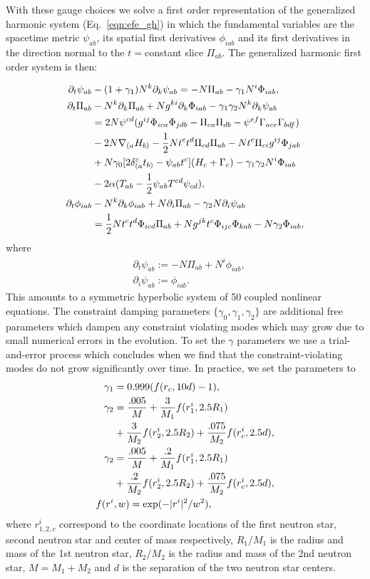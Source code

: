With these gauge choices we solve a first order representation of the generalized harmonic system (Eq.~\ref{eqn:efe_gh}) in which the fundamental variables are the spacetime metric $\psi_{ab}$, its spatial first derivatives $\phi_{iab}$ and its first derivatives in the direction normal to the $t=$constant slice $\Pi_{ab}$. The generalized harmonic first order system is then:

\begin{align}
  \partial_t\psi_{ab} &- (1 + \gamma_1)N^k\partial_k\psi_{ab} = -N\Pi_{ab} - \gamma_1N^i\Phi_{iab},  \\
  \partial_t\Pi_{ab} &- N^k\partial_k\Pi_{ab} + Ng^{ki}\partial_k\Phi_{iab} - \gamma_1\gamma_2N^k\partial_k\psi_{ab} \\
  &= 2N\psi^{cd}(g^{ij}\Phi_{ica}\Phi_{jdb} - \Pi_{ca}\Pi_{db} - \psi^{ef}\Gamma_{ace}\Gamma_{bdf}) \notag\\
  &-2N\nabla_{(a}H_{b)} - \frac{1}{2}Nt^ct^d\Pi_{cd}\Pi_{ab} - Nt^c\Pi_{ci}g^{ij}\Phi_{jab} \notag\\
  &+N\gamma_0[2\delta^c_{(a}t_{b)} - \psi_{ab}t^c](H_c + \Gamma_c) - \gamma_1\gamma_2N^i\Phi_{iab}\notag\\
    &-2\alpha(T_{ab} - \frac{1}{2}\psi_{ab}T^{cd}\psi_{cd}),\notag \\
  \partial_t\phi_{iab} &- N^k\partial_k\phi_{iab} + N\partial_i\Pi_{ab} - \gamma_2N\partial_i\psi_{ab} \\
  & = \frac{1}{2}Nt^ct^d\Phi_{icd}\Pi_{ab} + Ng^{jk}t^c\Phi_{ijc}\Phi_{kab} - N\gamma_2\Phi_{iab}\notag,
\end{align}
%
where
%
\begin{align}
  &\partial_t\psi_{ab} := - N\Pi_{ab} + N^i\phi_{iab}, \\
  &\partial_i\psi_{ab} := \phi_{iab}.
\end{align}
%
This amounts to a symmetric hyperbolic system of 50 coupled nonlinear equations. The constraint damping parameters $\{\gamma_0,\gamma_1,\gamma_2\}$ are additional free parameters which dampen any constraint violating modes which may grow due to small numerical errors in the evolution. To set the $\gamma$ parameters we use a trial-and-error process which concludes when we find that the constraint-violating modes do not grow significantly over time. In practice, we set the parameters to
%
\begin{align}
\gamma_1 &= 0.999 (f(r_c, 10d) - 1), \\
\gamma_2 &= \frac{.005}{M}+\frac{3}{M_1}f(r^i_1, 2.5R_1)\notag\\
&+\frac{3}{M_2}f(r^i_2, 2.5R_2)+\frac{.075}{M_2}f(r^i_c, 2.5d), \\
\gamma_2 &= \frac{.005}{M}+\frac{.2}{M_1}f(r^i_1, 2.5R_1)\notag\\
&+\frac{.2}{M_2}f(r^i_2, 2.5R_2)+\frac{.075}{M_2}f(r^i_c, 2.5d), \\
f(r^i&,w) = \exp(-|r^i|^2/w^2),
\end{align}
where $r^i_{1,2,c}$ correspond to the coordinate locations of the first neutron star, second neutron star and center of mass respectively, $R_1/M_1$ is the radius and mass of the 1st neutron star, $R_2/M_2$ is the radius and mass of the 2nd neutron star, $M = M_1 + M_2$ and $d$ is the separation of the two neutron star centers.

